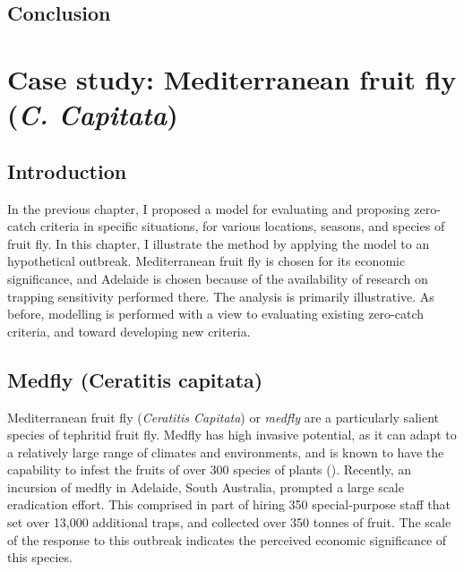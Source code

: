 \documentclass[
  oneside]{book}
\begin{document}
\hypertarget{conclusion-1}{%
\section{Conclusion}\label{conclusion-1}}

\hypertarget{case-study-mediterranean-fruit-fly-c.-capitata}{%
\chapter{\texorpdfstring{Case study: Mediterranean fruit fly (\emph{C. Capitata})}{Case study: Mediterranean fruit fly (C. Capitata)}}\label{case-study-mediterranean-fruit-fly-c.-capitata}}

\hypertarget{introduction-3}{%
\section{Introduction}\label{introduction-3}}

In the previous chapter, I proposed a model for evaluating and proposing zero-catch criteria in specific situations, for various locations, seasons, and species of fruit fly. In this chapter, I illustrate the method by applying the model to an hypothetical outbreak. Mediterranean fruit fly is chosen for its economic significance, and Adelaide is chosen because of the availability of research on trapping sensitivity performed there. The analysis is primarily illustrative. As before, modelling is performed with a view to evaluating existing zero-catch criteria, and toward developing new criteria.

\hypertarget{medfly-ceratitis-capitata}{%
\section{Medfly (Ceratitis capitata)}\label{medfly-ceratitis-capitata}}

Mediterranean fruit fly (\emph{Ceratitis Capitata}) or \emph{medfly} are a particularly salient species of tephritid fruit fly. Medfly has high invasive potential, as it can adapt to a relatively large range of climates and environments, and is known to have the capability to infest the fruits of over 300 species of plants (\citet{sciarretta2018}). Recently, an incursion of medfly in Adelaide, South Australia, prompted a large scale eradication effort. This comprised in part of hiring 350 special-purpose staff that set over 13,000 additional traps, and collected over 350 tonnes of fruit. The scale of the response to this outbreak indicates the perceived economic significance of this species.
\end{document}
